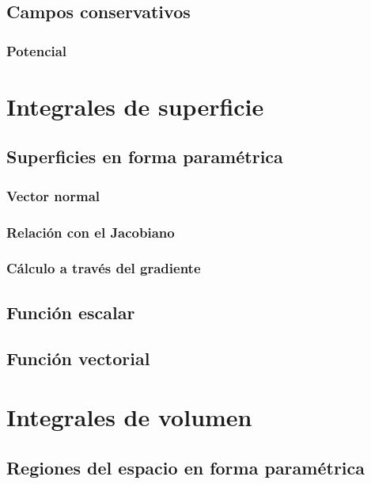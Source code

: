 \documentclass[12pt, fleqn]{report}                             %
\begin{document}
            \subsection{Campos conservativos}
            
                \subsubsection{Potencial}
        
        \section{Integrales de superficie}
        
            \subsection{Superficies en forma paramétrica}
            
                \subsubsection{Vector normal}
            
                \subsubsection{Relación con el Jacobiano}
                
                \subsubsection{Cálculo a través del gradiente}
            
            \subsection{Función escalar}
            
            \subsection{Función vectorial}
        
        \section{Integrales de volumen}
        
            \subsection{Regiones del espacio en forma paramétrica}
            
\end{document}
